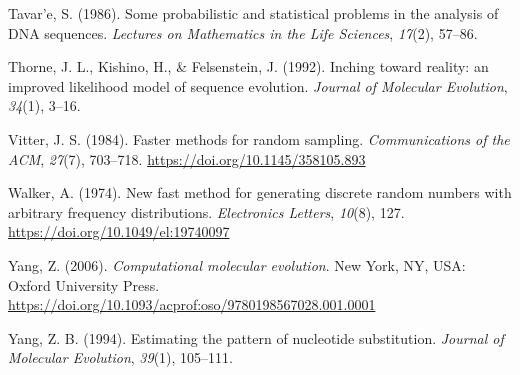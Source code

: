\documentclass[12pt,]{article}
\begin{document}
\leavevmode\hypertarget{ref-Tavare_1986gtr}{}%
Tavar\a'e, S. (1986). Some probabilistic and statistical problems in the analysis of DNA sequences. \emph{Lectures on Mathematics in the Life Sciences}, \emph{17}(2), 57--86.

\leavevmode\hypertarget{ref-Thorne_1992}{}%
Thorne, J. L., Kishino, H., \& Felsenstein, J. (1992). Inching toward reality: an improved likelihood model of sequence evolution. \emph{Journal of Molecular Evolution}, \emph{34}(1), 3--16.

\leavevmode\hypertarget{ref-Vitter_1984}{}%
Vitter, J. S. (1984). Faster methods for random sampling. \emph{Communications of the ACM}, \emph{27}(7), 703--718. \url{https://doi.org/10.1145/358105.893}

\leavevmode\hypertarget{ref-Walker_1974}{}%
Walker, A. (1974). New fast method for generating discrete random numbers with arbitrary frequency distributions. \emph{Electronics Letters}, \emph{10}(8), 127. \url{https://doi.org/10.1049/el:19740097}

\leavevmode\hypertarget{ref-Yang_2006}{}%
Yang, Z. (2006). \emph{Computational molecular evolution}. New York, NY, USA: Oxford University Press. \url{https://doi.org/10.1093/acprof:oso/9780198567028.001.0001}

\leavevmode\hypertarget{ref-Yang_1994}{}%
Yang, Z. B. (1994). Estimating the pattern of nucleotide substitution. \emph{Journal of Molecular Evolution}, \emph{39}(1), 105--111.
\end{document}

